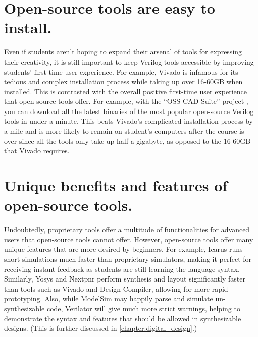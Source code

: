 \section{Open-source tools are easy to install.}

Even if students aren't hoping to expand their arsenal of tools for expressing their creativity, it is still important to keep Verilog tools accessible by improving students' first-time user experience. For example, Vivado is infamous for its tedious and complex installation process while taking up over 16-60GB when installed. This is contrasted with the overall positive first-time user experience that open-source tools offer. For example, with the ``OSS CAD Suite'' project \cite{osscadsuitebuildGitHub}, you can download all the latest binaries of the most popular open-source Verilog tools in under a minute. This beats Vivado's complicated installation process by a mile and is more-likely to remain on student's computers after the course is over since all the tools only take up half a gigabyte, as opposed to the 16-60GB that Vivado requires.

\section{Unique benefits and features of open-source tools.}

Undoubtedly, proprietary tools offer a multitude of functionalities for advanced users that open-source tools cannot offer. However, open-source tools offer many unique features that are more desired by beginners. For example, Icarus runs short simulations much faster than proprietary simulators, making it perfect for receiving instant feedback as students are still learning the language syntax. Similarly, Yosys and Nextpnr perform synthesis and layout significantly faster than tools such as Vivado and Design Compiler, allowing for more rapid prototyping. Also, while ModelSim may happily parse and simulate un-synthesizable code, Verilator will give much more strict warnings, helping to demonstrate the syntax and features that should be allowed in synthesizable designs. (This is further discussed in \autoref{chapter:digital_design}.)

